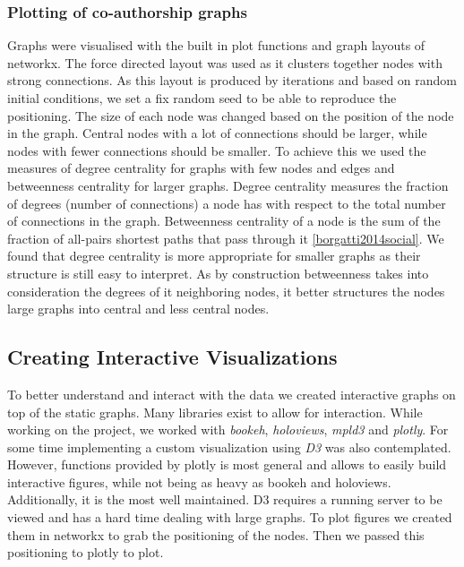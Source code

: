 \documentclass[article,twocolumn]{IEEEtran}
\begin{document}
    \hypertarget{plotting-of-co-authorship-graphs}{%
\subsubsection{Plotting of co-authorship
graphs}\label{plotting-of-co-authorship-graphs}}

Graphs were visualised with the built in plot functions and graph
layouts of networkx. The force directed layout was used as it clusters
together nodes with strong connections. As this layout is produced by
iterations and based on random initial conditions, we set a fix random
seed to be able to reproduce the positioning. The size of each node was
changed based on the position of the node in the graph. Central nodes
with a lot of connections should be larger, while nodes with fewer
connections should be smaller. To achieve this we used the measures of
degree centrality for graphs with few nodes and edges and betweenness
centrality for larger graphs. Degree centrality measures the fraction of
degrees (number of connections) a node has with respect to the total
number of connections in the graph. Betweenness centrality of a node is
the sum of the fraction of all-pairs shortest paths that pass through it
\ref{borgatti2014social}. We found that degree centrality is more
appropriate for smaller graphs as their structure is still easy to
interpret. As by construction betweenness takes into consideration the
degrees of it neighboring nodes, it better structures the nodes large
graphs into central and less central nodes.

    \hypertarget{creating-interactive-visualizations}{%
\subsection{Creating Interactive
Visualizations}\label{creating-interactive-visualizations}}

To better understand and interact with the data we created interactive
graphs on top of the static graphs. Many libraries exist to allow for
interaction. While working on the project, we worked with \emph{bookeh},
\emph{holoviews}, \emph{mpld3} and \emph{plotly}. For some time
implementing a custom visualization using \emph{D3} was also
contemplated. However, functions provided by plotly is most general and
allows to easily build interactive figures, while not being as heavy as
bookeh and holoviews. Additionally, it is the most well maintained. D3
requires a running server to be viewed and has a hard time dealing with
large graphs. To plot figures we created them in networkx to grab the
positioning of the nodes. Then we passed this positioning to plotly to
plot.
\end{document}

